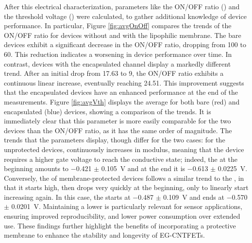 After this electrical characterization, parameters like the ON/OFF ratio (\ratio{}) and the threshold voltage (\vth{}) were calculated, to gather additional knowledge of device performance. In particular, Figure \ref{fig:avgOnOff} compares the trends of the ON/OFF ratio for devices without and with the lipophilic membrane. The bare devices exhibit a significant decrease in the ON/OFF ratio, dropping from 100 to 60. This reduction indicates a worsening in device performance over time. In contrast, devices with the encapsulated channel display a markedly different trend. After an initial drop from 17.63 to 9, the ON/OFF ratio exhibits a continuous linear increase, eventually reaching 24.51. This improvement suggests that the encapsulated devices have an enhanced performance at the end of the measurements.
Figure \ref{fig:avgVth} displays the average \vth{} for both bare (red) and encapsulated (blue) devices, showing a comparison of the trends. It is immediately clear that this parameter is more easily comparable for the two devices than the ON/OFF ratio, as it has the same order of magnitude. The trends that the parameters display, though differ for the two cases: for the unprotected devices, \vth{} continuously increases in modulus, meaning that the device requires a higher gate voltage to reach the conductive state; indeed, the \vth{} at the beginning amounts to \SI{-0.421}{} $\pm$ \SI{0.105}{\V} and at the end it is \SI{-0.613}{} $\pm$ \SI{0.0225}{\V}. Conversely, the \vth{} of membrane-protected devices
follows a similar trend to the \ion{}, in that it starts high, then drops very quickly at the beginning, only to linearly start increasing again. In this case, the \vth{} starts at \SI{-0.487}{} $\pm$ \SI{0.109}{\V} and ends at \SI{-0.570}{} $\pm$ \SI{0.0201}{\V}. Maintaining a lower \vth{} is particularly relevant for sensor applications, ensuring improved reproducibility, and lower power consumption over extended use. These findings further highlight the benefits of incorporating a protective membrane to enhance the stability and longevity of EG-CNTFETs.
